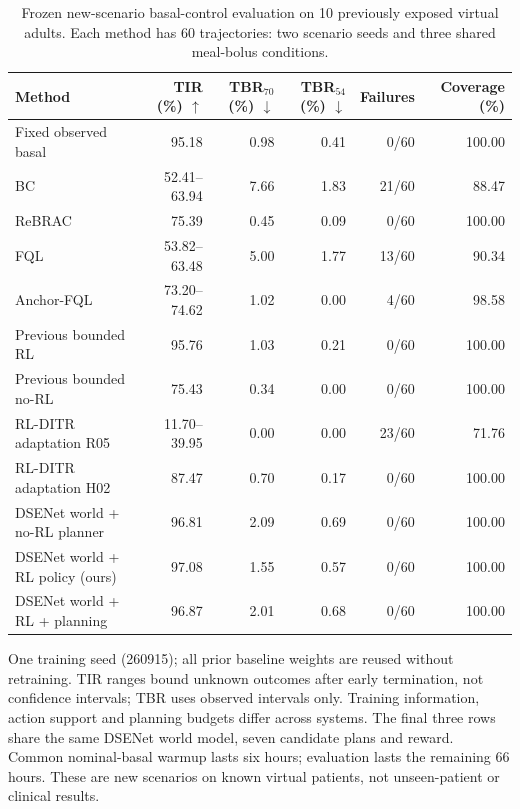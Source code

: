 \begin{table}[t]
\centering
\small
\caption{Frozen new-scenario basal-control evaluation on 10 previously exposed virtual adults. Each method has 60 trajectories: two scenario seeds and three shared meal-bolus conditions.}
\label{tab:control-main}
\begin{tabular}{lrrrrr}
\toprule
Method & TIR (\%) $\uparrow$ & TBR$_{70}$ (\%) $\downarrow$ & TBR$_{54}$ (\%) $\downarrow$ & Failures & Coverage (\%) \\
\midrule
Fixed observed basal & 95.18 & 0.98 & 0.41 & 0/60 & 100.00 \\
BC & 52.41--63.94 & 7.66 & 1.83 & 21/60 & 88.47 \\
ReBRAC & 75.39 & 0.45 & 0.09 & 0/60 & 100.00 \\
FQL & 53.82--63.48 & 5.00 & 1.77 & 13/60 & 90.34 \\
Anchor-FQL & 73.20--74.62 & 1.02 & 0.00 & 4/60 & 98.58 \\
Previous bounded RL & 95.76 & 1.03 & 0.21 & 0/60 & 100.00 \\
Previous bounded no-RL & 75.43 & 0.34 & 0.00 & 0/60 & 100.00 \\
RL-DITR adaptation R05 & 11.70--39.95 & 0.00 & 0.00 & 23/60 & 71.76 \\
RL-DITR adaptation H02 & 87.47 & 0.70 & 0.17 & 0/60 & 100.00 \\
DSENet world + no-RL planner & 96.81 & 2.09 & 0.69 & 0/60 & 100.00 \\
DSENet world + RL policy (ours) & 97.08 & 1.55 & 0.57 & 0/60 & 100.00 \\
DSENet world + RL + planning & 96.87 & 2.01 & 0.68 & 0/60 & 100.00 \\
\bottomrule
\end{tabular}
\par
\vspace{3pt}
\parbox{\textwidth}{\footnotesize One training seed (260915); all prior baseline weights are reused without retraining. TIR ranges bound unknown outcomes after early termination, not confidence intervals; TBR uses observed intervals only. Training information, action support and planning budgets differ across systems. The final three rows share the same DSENet world model, seven candidate plans and reward. Common nominal-basal warmup lasts six hours; evaluation lasts the remaining 66 hours. These are new scenarios on known virtual patients, not unseen-patient or clinical results.}
\end{table}
